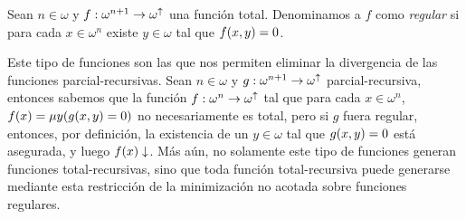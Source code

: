\begin{definition}
	Sean $n\in\omega$ y $f:\omega^{n + 1}\to\omega^{\uparrow}$ una función total. Denominamos a $f$ como \emph{regular} si para cada $x\in\omega^{n}$ existe $y\in\omega$ tal que $f\pa*{x, y} = 0$.
\end{definition}

Este tipo de funciones son las que nos permiten eliminar la divergencia de las funciones parcial-recursivas. Sean $n\in\omega$ y $g:\omega^{n + 1}\to\omega^{\uparrow}$ parcial-recursiva, entonces sabemos que la función $f:\omega^{n}\to\omega^{\uparrow}$ tal que para cada $x\in\omega^{n}$, $f\pa*{x} =\mu y\pa*{g\pa*{x, y} = 0}$ no necesariamente es total, pero si $g$ fuera regular, entonces, por definición, la existencia de un $y\in\omega$ tal que $g\pa*{x, y} = 0$ está asegurada, y luego $f\pa*{x}\ACABA$. Más aún, no solamente este tipo de funciones generan funciones total-recursivas, sino que toda función total-recursiva puede generarse mediante esta restricción de la minimización no acotada sobre funciones regulares.

